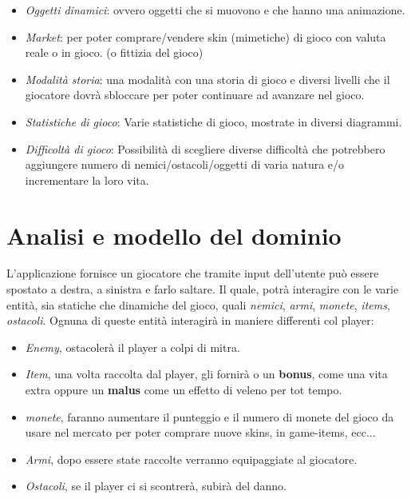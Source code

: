 \begin{itemize}
	\item \textsf{\small \emph{Oggetti dinamici}: ovvero oggetti che si muovono e che hanno una animazione.}
	\item \textsf{\small \emph{Market}: per poter comprare/vendere skin (mimetiche) di gioco con valuta reale o in gioco. (o fittizia del gioco)}
	\item \textsf{\small \emph{Modalità storia}: una modalità con una storia di gioco e diversi livelli che il giocatore dovrà sbloccare per poter continuare ad avanzare nel gioco.}
	\item \textsf{\small \emph{Statistiche di gioco}: Varie statistiche di gioco, mostrate in diversi diagrammi.}
	\item \textsf{\small \emph{Difficoltà di gioco}: Possibilità di scegliere diverse difficoltà che potrebbero aggiungere numero di nemici/ostacoli/oggetti di varia natura e/o incrementare la loro vita.}
\end{itemize}

\section{Analisi e modello del dominio}

\textsf{\small L'applicazione fornisce un giocatore che tramite input dell'utente può essere spostato a destra, a sinistra e farlo saltare. Il quale, potrà interagire con le varie entità, sia statiche che dinamiche del gioco, quali \emph{nemici}, \emph{armi}, \emph{monete}, \emph{items}, \emph{ostacoli}.
Ognuna di queste entità interagirà in maniere differenti col player: }\\

\begin{itemize}
	\item \textsf{\small \emph{Enemy}, ostacolerà il player a colpi di mitra.} %
	\item \textsf{\small \emph{Item}, una volta raccolta dal player, gli fornirà o un \textbf{bonus}, come una vita extra oppure un \textbf{malus} come un effetto di veleno per tot tempo.}
	\item \textsf{\small \emph{monete}, faranno aumentare il punteggio e il numero di monete del gioco da usare nel mercato per poter comprare nuove skins, in game-items, ecc...}
	\item \textsf{\small \emph{Armi}, dopo essere state raccolte verranno equipaggiate al giocatore.}
	\item \textsf{\small \emph{Ostacoli}, se il player ci si scontrerà, subirà del danno.}
\end{itemize}

